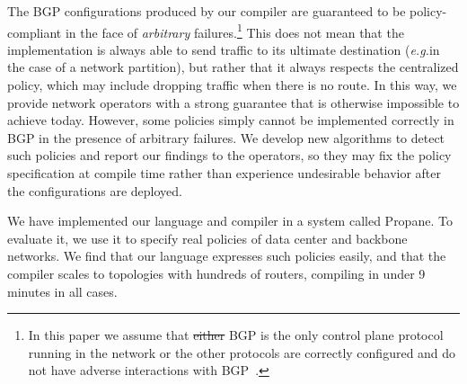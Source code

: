 \documentclass[10pt]{sigalternate052015} %
\newcommand{\dpw}[1]{\textcolor{tmlblue}{[dpw: #1]}}
\newcommand{\EG}{\emph{e.g.}}
\newcommand{\sysname}{{\small \sf Propane}\xspace}
\providecommand{\DIFadd}[1]{{\protect\color{blue}\uwave{#1}}} %
\providecommand{\DIFdel}[1]{{\protect\color{red}\sout{#1}}}                      %
\providecommand{\DIFaddbegin}{} %
\providecommand{\DIFaddend}{} %
\providecommand{\DIFdelbegin}{} %
\providecommand{\DIFdelend}{} %
\begin{document}
The BGP configurations produced by our compiler are
guaranteed to be policy-compliant in the face of
{\em arbitrary} failures.\footnote{In this paper we assume that \DIFdelbegin \DIFdel{either }\DIFdelend BGP is the only control plane protocol running in the network or the other protocols are correctly configured and do not have adverse interactions with BGP~\cite{igp-correctness1,igp-correctness2}.} This does not mean that the implementation is always
able to send traffic to its ultimate destination
(\EG in the case of a network partition), but rather that it always respects the
centralized policy, which may include dropping traffic when there is no route.
%
In this way, we provide network operators
with a strong guarantee that is otherwise impossible to achieve
today.
However, some policies simply cannot be implemented correctly in BGP in
 the presence of arbitrary failures.  We develop new
algorithms to detect such policies
and report our findings to the operators, so they may fix the policy
specification at compile time rather than experience undesirable
behavior after the configurations are deployed.


We have implemented our language and compiler in a system called \sysname. To evaluate it, we use it to specify real policies of data center and backbone networks.
We find that our language expresses such policies easily, and that the compiler scales to topologies with hundreds \DIFaddbegin \DIFadd{to thousands }\DIFaddend of routers, compiling in under 9 minutes in all cases.

%
\end{document}
